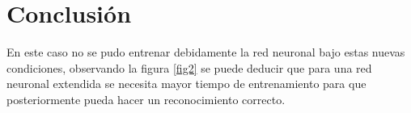 \documentclass{article}
\begin{document}
\newpage

\section{Conclusión}
En este caso no se pudo entrenar debidamente la red neuronal bajo estas nuevas condiciones, observando la figura \ref{fig2} se puede deducir que para una red neuronal extendida se necesita mayor tiempo de entrenamiento para que posteriormente pueda hacer un reconocimiento correcto.

\newpage


\end{document}
